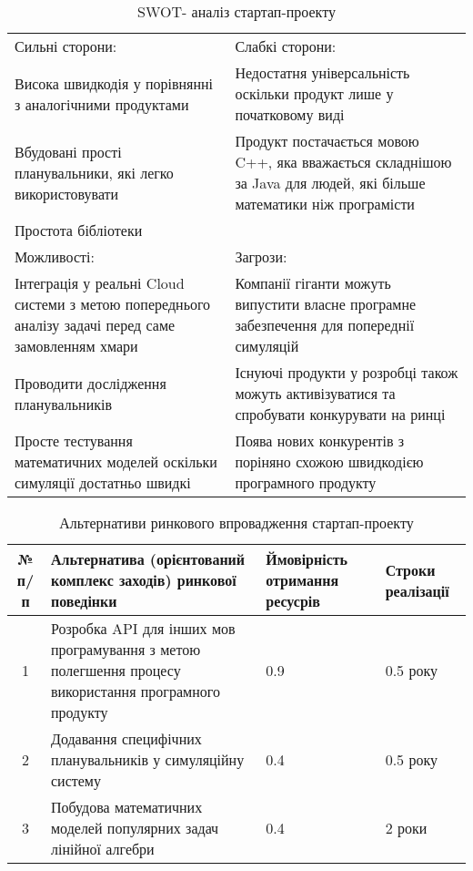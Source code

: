 \begin{table}[H]
	\centering
	\begin{tabular}{|p{5cm}|p{5cm}|}
		\hline
		Сильні сторони: & Слабкі сторони:
		\\
		
		\tabitem Висока швидкодія у порівнянні з аналогічними продуктами & \tabitem Недостатня універсальність оскільки продукт лише у початковому виді
		\\
		\tabitem Вбудовані прості планувальники, які легко використовувати & \tabitem Продукт постачається мовою C++, яка вважається складнішою за Java для людей, які більше  математики ніж програмісти
		\\
		\tabitem Простота бібліотеки & 
		\\ \hline
		
		Можливості: & Загрози:
		\\
		\tabitem Інтеграція у реальні Cloud системи з метою попереднього аналізу задачі перед саме замовленням хмари & \tabitem Компанії гіганти можуть випустити власне програмне забезпечення для попереднії симуляцій
		\\
		\tabitem Проводити дослідження планувальників & \tabitem Існуючі продукти у розробці також можуть активізуватися та спробувати конкурувати на ринці
		\\
		\tabitem Просте тестування математичних моделей оскільки симуляції достатньо швидкі & \tabitem Поява нових конкурентів з поріняно схожою швидкодією програмного продукту
		\\ \hline
		
	\end{tabular}
	\caption{SWOT- аналіз стартап-проекту}
\end{table}

\begin{table}[H]
	\centering
	\begin{tabular}{|c|p{4cm}|p{4cm}|p{4cm}|} \hline
		№ п/п
		& Альтернатива (орієнтований комплекс заходів) ринкової поведінки
		& Ймовірність отримання ресусрів & Строки реалізації
		\\ \hline
		
		1
		& Розробка API для інших мов програмування з метою полегшення процесу використання програмного продукту
		& 0.9
		& 0.5 року
		\\ \hline
		
		2
		& Додавання специфічних планувальників у симуляційну систему
		& 0.4
		& 0.5 року
		\\ \hline
		
		3
		& Побудова математичних моделей популярних задач лінійної алгебри
		& 0.4
		& 2 роки
		\\ \hline
	\end{tabular}
	\caption{Альтернативи ринкового впровадження стартап-проекту}
\end{table}

